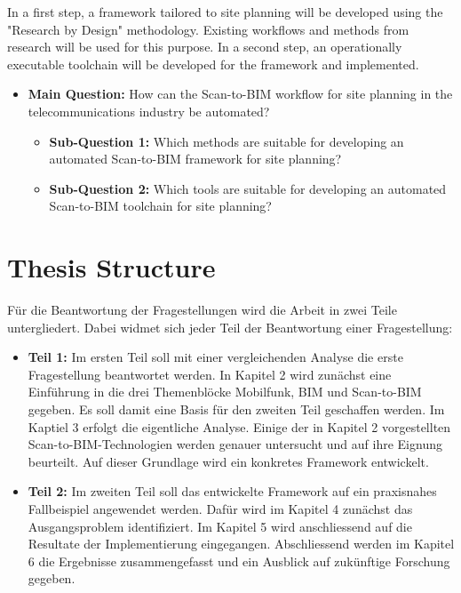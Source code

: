 \begin{English}
    In a first step, a framework tailored to site planning will be developed using the "Research by Design" methodology. Existing workflows and methods from research will be used for this purpose. In a second step, an operationally executable toolchain will be developed for the framework and implemented.

    \begin{itemize}
        \item \textbf{Main Question:} How can the Scan-to-BIM workflow for site planning in the telecommunications industry be automated?
        \begin{itemize}
            \item \textbf{Sub-Question 1:} Which methods are suitable for developing an automated Scan-to-BIM framework for site planning?
            \item \textbf{Sub-Question 2:} Which tools are suitable for developing an automated Scan-to-BIM toolchain for site planning?
        \end{itemize}
    \end{itemize}
\end{English}

\section{Thesis Structure}
\begin{German}
    Für die Beantwortung der Fragestellungen wird die Arbeit in zwei Teile untergliedert. Dabei widmet sich jeder Teil der Beantwortung einer Fragestellung:

    \begin{itemize}
        \item \textbf{Teil 1:} Im ersten Teil soll mit einer vergleichenden Analyse die erste Fragestellung beantwortet werden. In Kapitel 2 wird zunächst eine Einführung in die drei Themenblöcke Mobilfunk, BIM und Scan-to-BIM gegeben. Es soll damit eine Basis für den zweiten Teil geschaffen werden. Im Kaptiel 3 erfolgt die eigentliche Analyse. Einige der in Kapitel 2 vorgestellten Scan-to-BIM-Technologien werden genauer untersucht und auf ihre Eignung beurteilt. Auf dieser Grundlage wird ein konkretes Framework entwickelt.
        \item \textbf{Teil 2:} Im zweiten Teil soll das entwickelte Framework auf ein praxisnahes Fallbeispiel angewendet werden. Dafür wird im Kapitel 4 zunächst das Ausgangsproblem identifiziert. Im Kapitel 5 wird anschliessend auf die Resultate der Implementierung eingegangen. Abschliessend werden im Kapitel 6 die Ergebnisse zusammengefasst und ein Ausblick auf zukünftige Forschung gegeben.
    \end{itemize} 
\end{German}

